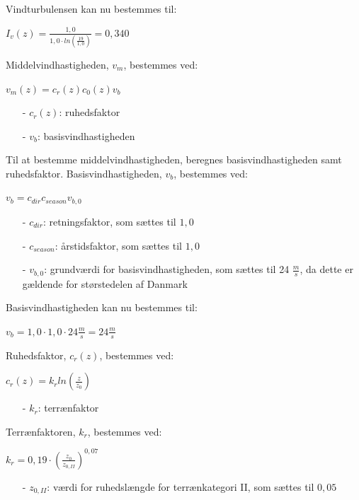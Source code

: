 Vindturbulensen kan nu bestemmes til:
\begin{center}
$I_v(z)=\frac{1,\!0}{1,\!0\cdot ln(\frac{19}{1,\!0})}=0,\!340$
\end{center}
Middelvindhastigheden, $v_m$, bestemmes ved:
\begin{center}
$v_m(z)=c_r(z)c_0(z)v_b$
\end{center}
\begin{itemize}
	\item[-] $c_r(z)$: ruhedsfaktor
	\item[-] $v_b$: basisvindhastigheden
\end{itemize}
Til at bestemme middelvindhastigheden, beregnes basisvindhastigheden samt ruhedsfaktor.
\newline
\newline
Basisvindhastigheden, $v_b$, bestemmes ved:
\begin{center}
$v_b=c_{dir}c_{season}v_{b,0}$
\end{center}
\begin{itemize}
	\item[-] $c_{dir}$: retningsfaktor, som sættes til $1,\!0$ \citep[ tabel 1a kapitel 4.2]{EU91}
	\item[-] $c_{season}$: årstidsfaktor, som sættes til $1,\!0$ \citep[ tabel 1b kapitel 4.2]{EU91}
	\item[-] $v_{b,0}$: grundværdi for basisvindhastigheden, som sættes til 24 $\frac{m}{s}$, da dette er gældende for størstedelen af Danmark \citep[ kapitel 4.2]{EU91}
\end{itemize}
Basisvindhastigheden kan nu bestemmes til:
\begin{center}
$v_b=1,\!0\cdot 1,\!0\cdot 24 \frac{m}{s}=24 \frac{m}{s}$
\end{center}
Ruhedsfaktor, $c_r(z)$, bestemmes ved:
\begin{center}
$c_r(z)=k_rln(\frac{z}{z_0})$
\end{center}
\begin{itemize}
	\item[-] $k_r$: terrænfaktor
\end{itemize}
Terrænfaktoren, $k_r$, bestemmes ved:
\begin{center}
$k_r=0,\!19\cdot (\frac{z_0}{z_{0,II}})^{0,\!07}$
\end{center}
\begin{itemize}
	\item[-] $z_{0,II}$: værdi for ruhedslængde for terrænkategori II, som sættes til $0,\!05$ \citep[ kapitel 4.3.2]{EU91}
\end{itemize}
